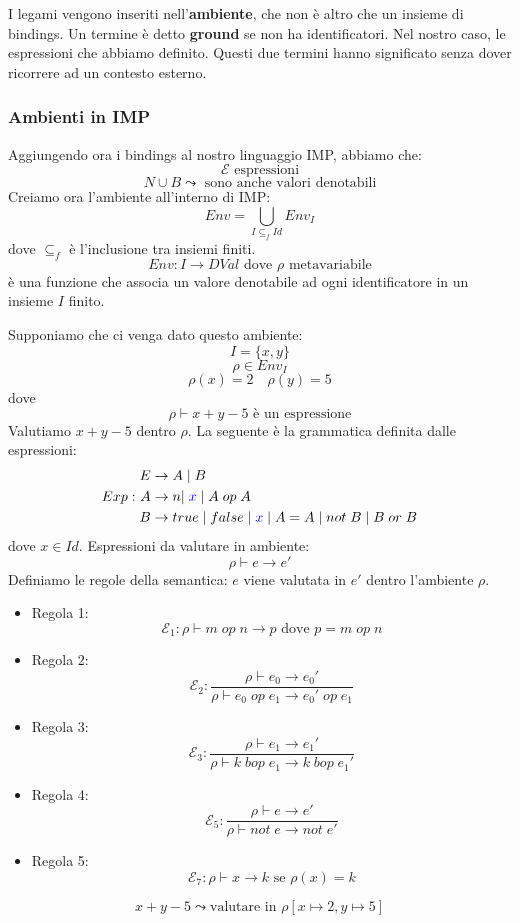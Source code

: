 \documentclass[a4paper]{article}
\begin{document}
{
  I legami vengono inseriti nell'\textbf{ambiente}, che non è 
  altro che un insieme di bindings. 
}
{
  Un termine è detto \textbf{ground} se non ha identificatori.
  Nel nostro caso, le espressioni che abbiamo definito.
}
\noindent
Questi due termini hanno significato senza dover ricorrere ad un contesto esterno.\\

\subsubsection{Ambienti in IMP}
Aggiungendo ora i bindings al nostro linguaggio IMP, abbiamo che:
\[
  \mathcal{E} \text{ espressioni}
\]
\[
  N \cup B \leadsto \text{ sono anche valori denotabili}
\]
Creiamo ora l'ambiente all'interno di IMP:
\[
  Env = \bigcup_{I \subseteq_f Id} Env_I
\]
dove $\subseteq_f$ è l'inclusione tra insiemi finiti.
\[
  Env: I \to DVal \text{ dove } \rho \text{ metavariabile}
\]
è una funzione che associa un valore denotabile ad ogni identificatore
in un insieme $I$ finito.

\begin{Example}
  Supponiamo che ci venga dato questo ambiente:
  \[
  I = \{x,y\}
\]
\[\rho \in Env_I\]
\[\rho(x) = 2 \quad \rho(y) = 5\]
dove 
\[
  \rho \vdash x + y - 5 \text{ è un espressione}
\]
Valutiamo $x+y-5$ dentro $\rho$. La seguente è la grammatica
definita dalle espressioni:
\[
  Exp: \begin{aligned}
    E &\to A \; | \; B\\
    A &\to n | \; \mathcolor{blue}{x} \; | \; A \; op \; A\\
    B &\to true \; | \; false \; | \; \mathcolor{blue}{x} \; | \; A = A \;| \;  not \; B \; | \; B \; or \; B
  \end{aligned}
\]
dove $x \in Id$. Espressioni da valutare in ambiente:
\[
  \rho \vdash e \to e'
\]
Definiamo le regole della semantica: $e$ viene valutata in $e'$ dentro l'ambiente $\rho$. 
\begin{itemize}
  \item Regola 1:
  \[
   \mathcal{E}_1 : \rho \vdash m \; op \; n \to p \text{ dove } p = m \; op \; n
  \]
  \item Regola 2:
  \[
    \mathcal{E}_2 : \frac{\rho \vdash e_0 \to e_0'}{\rho \vdash e_0 \; op \; e_1 \to e_0' \; op \; e_1}
  \]
  \item Regola 3:
  \[
    \mathcal{E}_3 : \frac{\rho \vdash e_1 \to e_1'}{\rho \vdash k \; bop \; e_1 \to k \; bop \; e_1'}
  \]
  \item Regola 4: 
  \[
    \mathcal{E}_5: \frac{\rho \vdash e \to e'}{\rho \vdash not \; e \to not \; e'}
  \]
  \item Regola 5:
  \[
    \mathcal{E}_7: \rho \vdash x \to k \text{ se } \rho(x) = k
  \]
\end{itemize}
\[
  x + y - 5 \leadsto \text{valutare in } \rho [x \mapsto 2, y \mapsto 5]
\]

\end{Example}
\end{document}

